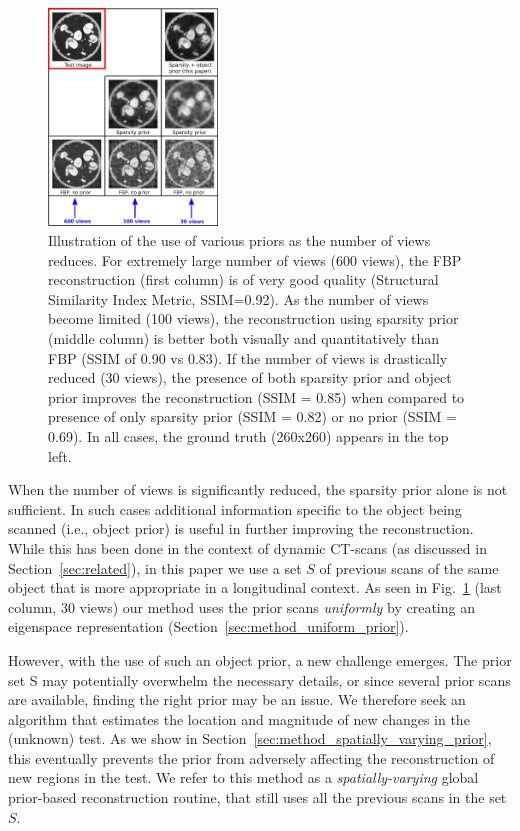 \documentclass[journal]{IEEEtran}
\begin{document}
 \begin{figure}[t]
\centering
	\includegraphics[width=0.4\textwidth]{../images/story/story.png}
        \caption{Illustration of the use of various priors as the
          number of views reduces. For extremely large number of views
          (600 views), the FBP reconstruction (first column) is of
          very good quality (Structural Similarity Index Metric,
          SSIM=0.92). As the number of views become limited (100
          views), the reconstruction using sparsity prior (middle
          column) is better both visually and quantitatively than FBP
          (SSIM of 0.90 vs 0.83). If the number of views is
          drastically reduced (30 views), the presence of both
          sparsity prior and object prior improves the reconstruction
          (SSIM = 0.85) when compared to presence of only sparsity
          prior (SSIM = 0.82) or no prior (SSIM = 0.69). In all cases,
          the ground truth (260x260) appears in the top left.}
 \label{fig:story}
 \end{figure} 

 When the number of views is significantly reduced, the sparsity prior
 alone is not sufficient.  In such cases additional information
 specific to the object being scanned (i.e., object prior) is useful
 in further improving the reconstruction.  While this has been done in
 the context of dynamic CT-scans (as discussed in
 Section~\ref{sec:related}), in this paper we use a set $S$ of
 previous scans of the same object that is more appropriate in a
 longitudinal context. As seen in Fig.~\ref{fig:story} (last column,
 30 views) our method uses the prior scans \emph{uniformly} by
 creating an eigenspace representation
 (Section~\ref{sec:method_uniform_prior}).

 However, with the use of such an object prior, a new challenge
 emerges. The prior set S may potentially overwhelm the necessary
 details, or since several prior scans are available, finding the
 right prior may be an issue. We therefore seek an algorithm that
 estimates the location and magnitude of new changes in the (unknown)
 test. As we show in Section~\ref{sec:method_spatially_varying_prior},
 this eventually prevents the prior from adversely affecting the
 reconstruction of new regions in the test. We refer to this method as
 a \textit{spatially-varying} global prior-based reconstruction
 routine, that still uses all the previous scans in the set $S$.
\end{document}
